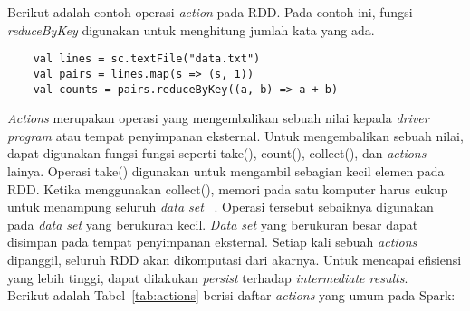 Berikut adalah contoh operasi \textit{action} pada RDD. Pada contoh ini, fungsi \textit{reduceByKey} digunakan untuk menghitung jumlah kata yang ada.

\begin{verbatim}
    val lines = sc.textFile("data.txt") 
    val pairs = lines.map(s => (s, 1))
    val counts = pairs.reduceByKey((a, b) => a + b)
\end{verbatim}

\textit{Actions} merupakan operasi yang mengembalikan sebuah nilai kepada \textit{driver program} atau tempat penyimpanan eksternal. Untuk mengembalikan sebuah nilai, dapat digunakan fungsi-fungsi seperti take(), count(), collect(), dan \textit{actions} lainya. Operasi take() digunakan untuk mengambil sebagian kecil elemen pada RDD. Ketika menggunakan collect(), memori pada satu komputer harus cukup untuk menampung seluruh \textit{data set} ~\cite{holdenkarau:07:ls}. Operasi tersebut sebaiknya digunakan pada \textit{data set} yang berukuran kecil. \textit{Data set} yang berukuran besar dapat disimpan pada tempat penyimpanan eksternal. Setiap kali sebuah \textit{actions} dipanggil, seluruh RDD akan dikomputasi dari akarnya. Untuk mencapai efisiensi yang lebih tinggi, dapat dilakukan \textit{persist} terhadap \textit{intermediate results}. \\

Berikut adalah Tabel~\ref{tab:actions} berisi daftar \textit{actions} yang umum pada Spark:


